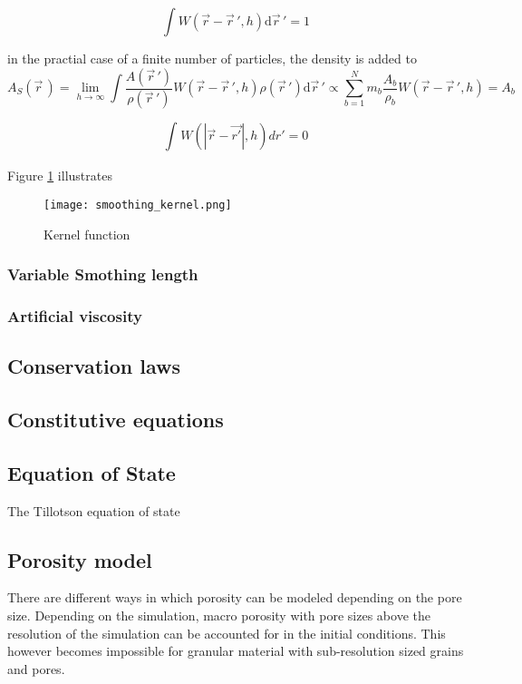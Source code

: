 \begin{equation} \label{eq:kernel_normalization}
    \int W(\vec{r} - \vec{r}\,', h)\mathrm d\vec{r}\,' = 1
\end{equation}

in the practial case of a finite number of particles, the density is added to
\begin{equation}
    {\displaystyle A_{S}({\vec {r}}\,)=\lim \limits _{h\rightarrow \infty }\int {\frac {A({\vec {r}}\,')}{\rho ({\vec {r}}\,')}}W({\vec {r}}-{\vec {r}}\,',h)\rho ({\vec {r}}\,')\mathrm {d} {\vec {r}}\,'\propto \sum \limits _{b=1}^{N}m_{b}{\frac {A_{b}}{\rho _{b}}}W({\vec {r}}-{\vec {r}}\,',h)=A_{b}}
\end{equation}




\begin{equation}
    \int_{}^{} W(|\vec{r} - \vec{r'}|, h)dr' = 0
\end{equation}


Figure \ref{fig:smoothing_kernel} illustrates

\begin{figure}[H]
    \centering
    \texttt{[image: smoothing\_kernel.png]}
    \caption{Kernel function \cite{image:smoothing_kernel}}
    \label{fig:smoothing_kernel}
\end{figure}

\subsubsection{Variable Smothing length}
\subsubsection{Artificial viscosity}

\subsection{Conservation laws}
\subsection{Constitutive equations}

\subsection{Equation of State}
The Tillotson equation of state \cite{Tillotson_1962}


\subsection{Porosity model}
There are different ways in which porosity can be modeled depending on the pore size. Depending on the simulation, macro porosity with pore sizes above the resolution of the simulation can be accounted for in the initial conditions. This however becomes impossible for granular material with sub-resolution sized grains and pores.

